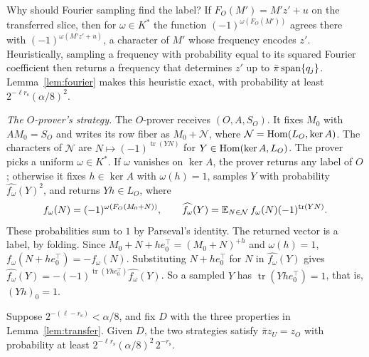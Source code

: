 Why should Fourier sampling find the label? If $F_O(M')=M'z'+u$ on the transferred slice, then for $\omega\in K^*$ the function $(-1)^{\omega(F_O(M'))}$ agrees there with $(-1)^{\omega(M'z'+u)}$, a character of $M'$ whose frequency encodes $z'$. Heuristically, sampling a frequency with probability equal to its squared Fourier coefficient then returns a frequency that determines $z'$ up to $\bar\pi\operatorname{span}\{q_j\}$. Lemma~\ref{lem:fourier} makes this heuristic exact, with probability at least $2^{-\ell r_{\mathrm s}}(\alpha/8)^2$.

\emph{The $O$-prover's strategy.} The $O$-prover receives $(O,A,S_O)$. It fixes $M_0$ with $AM_0=S_O$ and writes its row fiber as $M_0+\mathcal N$, where $\mathcal N=\operatorname{Hom}(L_O,\ker A)$. The characters of $\mathcal N$ are $N\mapsto(-1)^{\operatorname{tr}(YN)}$ for $Y\in\operatorname{Hom}(\ker A,L_O)$. The prover picks a uniform $\omega\in K^*$. If $\omega$ vanishes on $\ker A$, the prover returns any label of $O$; otherwise it fixes $h\in\ker A$ with $\omega(h)=1$, samples $Y$ with probability $\widehat{f_\omega}(Y)^2$, and returns $Yh\in L_O$, where
\[
f_\omega(N)=(-1)^{\omega(F_O(M_0+N))},\qquad\widehat{f_\omega}(Y)=\mathbb{E}_{N\in\mathcal N}\,f_\omega(N)(-1)^{\operatorname{tr}(YN)}.
\]
These probabilities sum to $1$ by Parseval's identity. The returned vector is a label, by folding. Since $M_0+N+he_0^\top=(M_0+N)^{+h}$ and $\omega(h)=1$, $f_\omega(N+he_0^\top)=-f_\omega(N)$. Substituting $N+he_0^\top$ for $N$ in $\widehat{f_\omega}(Y)$ gives $\widehat{f_\omega}(Y)=-(-1)^{\operatorname{tr}(Yhe_0^\top)}\widehat{f_\omega}(Y)$. So a sampled $Y$ has $\operatorname{tr}(Yhe_0^\top)=1$, that is, $(Yh)_0=1$.

\begin{lemma}\label{lem:fourier}
Suppose $2^{-(\ell-r_{\mathrm s})}<\alpha/8$, and fix $D$ with the three properties in Lemma~\ref{lem:transfer}. Given $D$, the two strategies satisfy $\bar\pi z_U=z_O$ with probability at least $2^{-\ell r_{\mathrm s}}(\alpha/8)^2\,2^{-r_{\mathrm s}}$.
\end{lemma}

